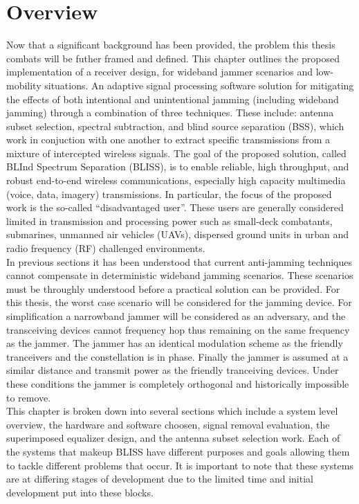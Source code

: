 \section{Overview}

Now that a significant background has been provided, the problem this thesis combats will be futher framed and defined.  This chapter outlines the proposed implementation of a receiver design, for wideband jammer scenarios and low-mobility situations.  An adaptive signal processing software solution for mitigating the effects of both intentional and unintentional jamming (including wideband jamming) through a combination of three techniques.  These include: antenna subset selection, spectral subtraction, and blind source separation (BSS), which work in conjuction with one another to extract specific transmissions from a mixture of intercepted wireless signals. The goal of the proposed solution, called BLInd Spectrum Separation (BLISS), is to enable reliable, high throughput, and robust end-to-end wireless communications, especially high capacity multimedia (voice, data, imagery) transmissions. In particular, the focus of the proposed work is the so-called ``disadvantaged user''.  These users are generally considered limited in transmission and processing power such as small-deck combatants, submarines, unmanned air vehicles (UAVs), dispersed ground units in urban and radio frequency (RF) challenged environments.\\

In previous sections it has been understood that current anti-jamming techniques cannot compensate in deterministic wideband jamming scenarios.  These scenarios must be throughly understood before a practical solution can be provided.  For this thesis, the worst case scenario will be considered for the jamming device.  For simplification a narrowband jammer will be considered as an adversary, and the transceiving devices cannot frequency hop thus remaining on the same frequency as the jammer.  The jammer has an identical modulation scheme as the friendly tranceivers and the constellation is in phase.  Finally the jammer is assumed at a similar distance and transmit power as the friendly tranceiving devices.  Under these conditions the jammer is completely orthogonal and historically impossible to remove.\\

This chapter is broken down into several sections which include a system level overview, the hardware and software choosen, signal removal evaluation, the superimposed equalizer design, and the antenna subset selection work.  Each of the systems that makeup BLISS have different purposes and goals allowing them to tackle different problems that occur.  It is important to note that these systems are at differing stages of development due to the limited time and initial development put into these blocks.\\ 

